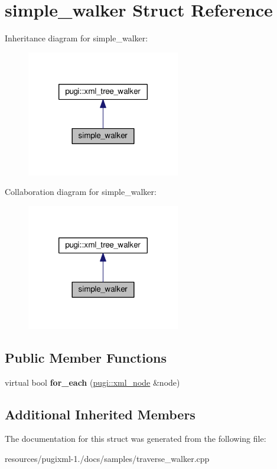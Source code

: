 \hypertarget{structsimple__walker}{\section{simple\+\_\+walker Struct Reference}
\label{structsimple__walker}
}


Inheritance diagram for simple\+\_\+walker\+:
\nopagebreak
\begin{figure}[H]
\begin{center}
\leavevmode
\includegraphics[width=190pt]{structsimple__walker__inherit__graph}
\end{center}
\end{figure}


Collaboration diagram for simple\+\_\+walker\+:
\nopagebreak
\begin{figure}[H]
\begin{center}
\leavevmode
\includegraphics[width=190pt]{structsimple__walker__coll__graph}
\end{center}
\end{figure}
\subsection*{Public Member Functions}
\begin{DoxyCompactItemize}
\item 
\hypertarget{structsimple__walker_a8afb03751c939134462d557f2a3ff023}{virtual bool {\bfseries for\+\_\+each} (\hyperlink{classpugi_1_1xml__node}{pugi\+::xml\+\_\+node} \&node)}\label{structsimple__walker_a8afb03751c939134462d557f2a3ff023}

\end{DoxyCompactItemize}
\subsection*{Additional Inherited Members}


The documentation for this struct was generated from the following file\+:\begin{DoxyCompactItemize}
\item 
resources/pugixml-\/1./docs/samples/traverse\+\_\+walker.\+cpp\end{DoxyCompactItemize}

